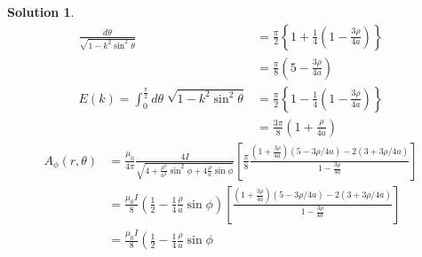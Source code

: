 \documentclass[letter,12pt]{article}
\theoremstyle{definition}
\newtheorem*{sol}{Solution}
\begin{document}
\begin{enumerate}
\begin{enumerate}
\begin{sol}
\begin{align*}
                        \frac{d\theta}{\sqrt{1 - k^2 \sin^2 \theta}}
                        &=
                        \frac{\pi}{2}
                        \left\{
                            1 + \frac{1}{4}\left(1 - \frac{3 \rho}{4 a}\right)
                        \right\}
                        \\
                        &=
                        \frac{\pi}{8}
                        \left(
                            5 - \frac{3\rho}{4a}
                        \right)
                        \\
                        E(k) = \int_0^{\frac{\pi}{2}}
                        d\theta\;\sqrt{1 - k^2 \sin^2 \theta}
                        &=
                        \frac{\pi}{2}
                        \left\{
                            1 - \frac{1}{4}\left(1 - \frac{3 \rho}{4 a}\right)
                        \right\}
                        \\
                        &=
                        \frac{3\pi}{8}
                        \left(
                            1 + \frac{\rho}{4a}
                        \right)
                    \end{align*}
                    \begin{align*}
                        A_\phi(r, \theta)
                        &=
                        \frac{\mu_0}{4\pi}
                        \frac{4I}
                        {\sqrt{4 + \frac{\rho^2}{a^2} \sin^2 \phi + 4 \frac{\rho}{a} \sin \phi}}
                        \left[
                            \frac{\pi}{8}
                            \frac{(1 + \frac{3\rho}{4a})
                            (5 - 3\rho / 4 a) - 2(3 + 3\rho / 4a)}{1 - \frac{3\rho}{4a}}
                        \right]
                        \\
                        &=
                        \frac{\mu_0 I}{8}
                        \left(
                            \frac{1}{2}
                            -
                            \frac{1}{4}\frac{\rho}{a}\sin \phi
                        \right)
                        \left[
                            \frac{(1 + \frac{3\rho}{4a})
                            (5 - 3\rho / 4 a) - 2(3 + 3\rho / 4a)}{1 - \frac{3\rho}{4a}}
                        \right]
                        \\
                        &=
                        \frac{\mu_0 I}{8}
                        \left(
                            \frac{1}{2}
                            -
                            \frac{1}{4}\frac{\rho}{a}\sin \phi

\end{align*}
\end{sol}
\end{enumerate}
\end{enumerate}
\end{document}
